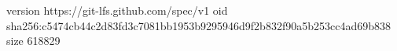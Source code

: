 version https://git-lfs.github.com/spec/v1
oid sha256:c5474cb44c2d83fd3c7081bb1953b9295946d9f2b832f90a5b253cc4ad69b838
size 618829
